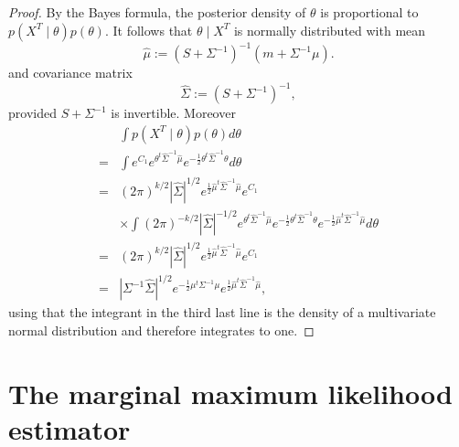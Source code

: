 \documentclass[12pt]{article}
\begin{document}
\begin{proof}
By the Bayes formula, the posterior density of \(\theta\) is proportional to \(p(X^T\mid\theta)p(\theta)\). It follows that  \(\theta\mid X^T\) is normally distributed with mean 
\[\hat\mu :=( S + \Sigma^{-1} )^{-1} (m + \Sigma^{-1}\mu).\]
 and covariance matrix \[\hat\Sigma:=(S+\Sigma^{-1})^{-1},\]
provided $S+\Sigma^{-1}$ is invertible.  
 Moreover 
 \begin{align*}
 &\int  p(X^T\mid\theta)p(\theta)d\theta \\
 = & \int  e^{C_1} e^{\theta^t\hat\Sigma^{-1}\hat\mu } e^{-\frac12\theta^t \hat\Sigma^{-1} \theta} d\theta\\
 = & (2\pi)^{k/2}| \hat\Sigma|^{1/2}e^{\frac12\hat\mu^t\hat\Sigma^{-1}\hat\mu}e^{C_1}\\
 &\times \int (2\pi)^{-k/2}|\hat\Sigma|^{-1/2}e^{\theta^t\hat\Sigma^{-1}\hat\mu } e^{-\frac12\theta^t \hat\Sigma^{-1} \theta} e^{-\frac12\hat\mu^t\hat\Sigma^{-1}\hat\mu}d\theta\\
 = & (2\pi)^{k/2}|\hat\Sigma|^{1/2}e^{\frac12\hat\mu^t\hat\Sigma^{-1}\hat\mu}e^{C_1}\\
 = & |\Sigma^{-1}\hat\Sigma|^{1/2}e^{-\frac12\mu^t\Sigma^{-1}\mu} e^{\frac12\hat\mu^t\hat\Sigma^{-1}\hat\mu},
 \end{align*}
 using that the integrant in the third last line is the density of a multivariate normal distribution and therefore integrates to one.
\end{proof}

\section{The marginal maximum likelihood estimator}
\end{document}
